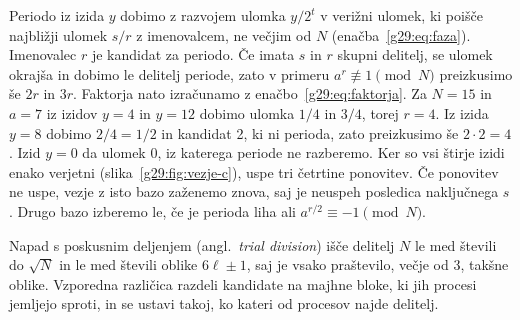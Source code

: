  Periodo iz izida $y$ dobimo z razvojem ulomka $y/2^t$ v verižni ulomek, ki poišče najbližji ulomek $s/r$ z imenovalcem, ne večjim od $N$ (enačba~\eqref{g29:eq:faza}). Imenovalec $r$ je kandidat za periodo. Če imata $s$ in $r$ skupni delitelj, se ulomek okrajša in dobimo le delitelj periode, zato v primeru $a^r \not\equiv 1 \pmod N$ preizkusimo še $2r$ in $3r$. Faktorja nato izračunamo z enačbo~\eqref{g29:eq:faktorja}. Za $N = 15$ in $a = 7$ iz izidov $y = 4$ in $y = 12$ dobimo ulomka $1/4$ in $3/4$, torej $r = 4$. Iz izida $y = 8$ dobimo $2/4 = 1/2$ in kandidat 2, ki ni perioda, zato preizkusimo še $2 \cdot 2 = 4$. Izid $y = 0$ da ulomek $0$, iz katerega periode ne razberemo. Ker so vsi štirje izidi enako verjetni (slika~\ref{g29:fig:vezje-c}), uspe tri četrtine ponovitev. Če ponovitev ne uspe, vezje z isto bazo zaženemo znova, saj je neuspeh posledica naključnega $s$. Drugo bazo izberemo le, če je perioda liha ali $a^{r/2} \equiv -1 \pmod N$.

 Napad s poskusnim deljenjem (angl.\ \emph{trial division}) išče delitelj $N$ le med števili do $\sqrt{N}$ in le med števili oblike $6\ell \pm 1$, saj je vsako praštevilo, večje od 3, takšne oblike. Vzporedna različica razdeli kandidate na majhne bloke, ki jih procesi jemljejo sproti, in se ustavi takoj, ko kateri od procesov najde delitelj.

